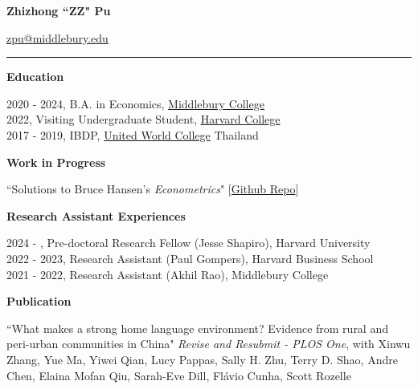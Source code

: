 \documentclass{article}
\begin{document}
{\Large \textbf{Zhizhong ``ZZ" Pu}\par}
    \href{mailto:zpu@middlebury.edu}{zpu@middlebury.edu} \href{https://github.com/zhizhongpu}{\faGithub} \hspace{0.2em} \\
    \vspace{-0.1in}
    \rule{\textwidth}{1pt}
    \vspace{0in}

{\Large \textbf{Education}}\\
    \vspace{-0.15in}
	\begin{adjustwidth}{1.5em}{0pt}
        2020 - 2024, B.A. in Economics, \href{http://www.middlebury.edu/}{Middlebury College}\\
        2022, Visiting Undergraduate Student, \href{http://www.harvard.edu/}{Harvard College}\\
        2017 - 2019, IBDP, \href{https://www.uwc.org/about}{United World College} Thailand
    \end{adjustwidth}
    \vspace{0.1in}


{\Large \textbf{Work in Progress}}\\
    \vspace{-0.15in}
	\begin{adjustwidth}{1.5em}{0pt}     
        ``Solutions to Bruce Hansen's \textit{Econometrics}" [\href{https://github.com/zhizhongpu/solutions_econometrics_hansen}{Github Repo}]
    \end{adjustwidth}
    \vspace{0.1in}
	
{\Large \textbf{Research Assistant Experiences}}
\begin{adjustwidth}{1.5em}{0pt}
    2024 - , Pre-doctoral Research Fellow (Jesse Shapiro), Harvard University \\
    2022 - 2023, Research Assistant (Paul Gompers), Harvard Business School \\
    2021 - 2022, Research Assistant (Akhil Rao), Middlebury College
\end{adjustwidth}
\vspace{0.1in}


{\Large \textbf{Publication}}\\
    \vspace{-0.15in}
	\begin{adjustwidth}{1.5em}{0pt}
     ``What makes a strong home language environment? Evidence from rural and peri-urban communities in China" \textit{Revise and Resubmit - PLOS One}, with Xinwu Zhang, Yue Ma, Yiwei Qian, Lucy Pappas, Sally H. Zhu, Terry D. Shao, Andre Chen, Elaina Mofan Qiu, Sarah-Eve Dill, Flávio Cunha, Scott Rozelle
    \end{adjustwidth}
	\vspace{0.1in}
	
\end{document}
